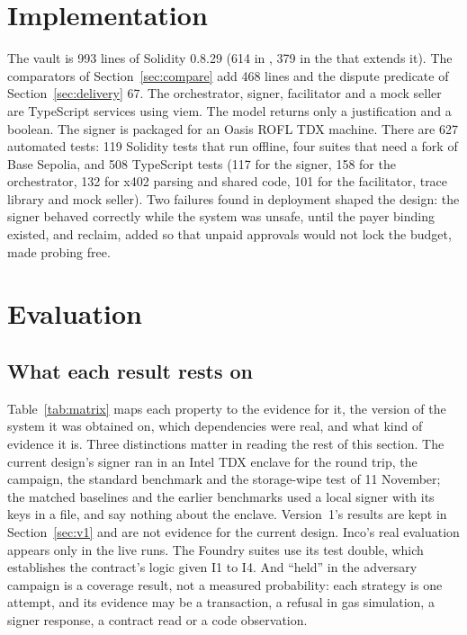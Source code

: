 \section{Implementation}
\label{sec:impl}

The vault is 993 lines of Solidity 0.8.29 (614 in , 379 in the  that extends it). The comparators
of Section~\ref{sec:compare} add 468 lines and the dispute predicate of Section~\ref{sec:delivery} 67. The orchestrator, signer, facilitator
and a mock seller are TypeScript services using viem. The model returns only a justification and a boolean. The signer is packaged for an
Oasis ROFL TDX machine. There are 627 automated tests: 119 Solidity tests that run offline, four suites that need a fork of Base Sepolia, and 508
TypeScript tests (117 for the signer, 158 for the orchestrator, 132 for x402 parsing and shared code, 101 for the facilitator, trace library and
mock seller). Two failures found in deployment shaped the design: the signer behaved correctly while the system was unsafe, until the payer binding
existed, and reclaim, added so that unpaid approvals would not lock the budget, made probing free.

\section{Evaluation}
\label{sec:eval}

\subsection{What each result rests on}

Table~\ref{tab:matrix} maps each property to the evidence for it, the version of the system it was obtained on, which dependencies were real, and
what kind of evidence it is. Three distinctions matter in reading the rest of this section. The current design's signer ran in an Intel TDX enclave for the
round trip, the campaign, the standard benchmark and the storage-wipe test of 11 November; the matched baselines and the earlier benchmarks used a local
signer with its keys in a file, and say nothing about the enclave. Version~1's results are kept in Section~\ref{sec:v1} and are not evidence for the
current design. Inco's real evaluation appears only in the live runs. The Foundry suites
use its test double, which establishes the contract's logic given I1 to I4. And ``held'' in the adversary campaign is a coverage result, not a measured
probability: each strategy is one attempt, and its evidence may be a transaction, a refusal in gas simulation, a signer response, a contract read or a
code observation.


